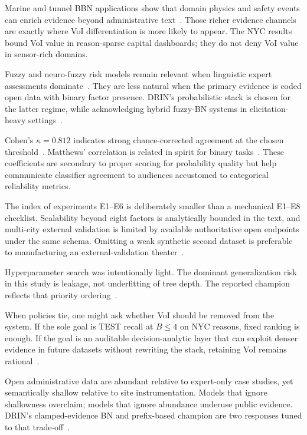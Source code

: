 Marine and tunnel BBN applications show that domain physics and safety events can enrich evidence beyond administrative text~\cite{Comu2023,Wu2015,Wang2016,Leu2012}. Those richer evidence channels are exactly where VoI differentiation is more likely to appear. The NYC results bound VoI value in reason-sparse capital dashboards; they do not deny VoI value in sensor-rich domains.

Fuzzy and neuro-fuzzy risk models remain relevant when linguistic expert assessments dominate~\cite{Ebrat2014,Islam2017}. They are less natural when the primary evidence is coded open data with binary factor presence. DRIN's probabilistic stack is chosen for the latter regime, while acknowledging hybrid fuzzy-BN systems in elicitation-heavy settings~\cite{Qazi2016,Zou2017}.

Cohen's $\kappa{=}0.812$ indicates strong chance-corrected agreement at the chosen threshold~\cite{Cohen1960}. Matthews' correlation is related in spirit for binary tasks~\cite{Matthews1975}. These coefficients are secondary to proper scoring for probability quality but help communicate classifier agreement to audiences accustomed to categorical reliability metrics.

The index of experiments E1--E6 is deliberately smaller than a mechanical E1--E8 checklist. Scalability beyond eight factors is analytically bounded in the text, and multi-city external validation is limited by available authoritative open endpoints under the same schema. Omitting a weak synthetic second dataset is preferable to manufacturing an external-validation theater~\cite{Woldesenbet2016}.

Hyperparameter search was intentionally light. The dominant generalization risk in this study is leakage, not underfitting of tree depth. The reported champion reflects that priority ordering~\cite{Egwim2021,Friedman2001}.

When policies tie, one might ask whether VoI should be removed from the system. If the sole goal is TEST recall at $B{\leq}4$ on NYC reasons, fixed ranking is enough. If the goal is an auditable decision-analytic layer that can exploit denser evidence in future datasets without rewriting the stack, retaining VoI remains rational~\cite{Howard1966,Song2021}.

Open administrative data are abundant relative to expert-only case studies, yet semantically shallow relative to site instrumentation. Models that ignore shallowness overclaim; models that ignore abundance underuse public evidence. DRIN's clamped-evidence BN and prefix-based champion are two responses tuned to that trade-off~\cite{Woldesenbet2016,Luu2009,Egwim2021,Regona2024}.

